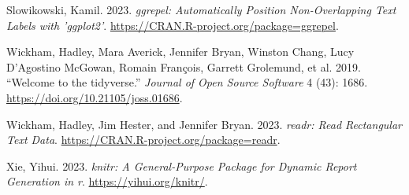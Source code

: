 \documentclass[
  letterpaper,
  DIV=11,
  numbers=noendperiod]{scrartcl}
\newlength{\cslhangindent}
\newlength{\cslentryspacingunit} %
\newenvironment{CSLReferences}[2] %
 {%
  \setlength{\parindent}{0pt}
  \ifodd #1
  \let\oldpar\par
  \def\par{\hangindent=\cslhangindent\oldpar}
  \fi
  \setlength{\parskip}{#2\cslentryspacingunit}
 }%
 {}
\begin{document}
\begin{CSLReferences}{1}{0}
\leavevmode{}%
Slowikowski, Kamil. 2023. \emph{{ggrepel}: Automatically Position
Non-Overlapping Text Labels with '{ggplot2}'}.
\url{https://CRAN.R-project.org/package=ggrepel}.

\leavevmode{}%
Wickham, Hadley, Mara Averick, Jennifer Bryan, Winston Chang, Lucy
D'Agostino McGowan, Romain François, Garrett Grolemund, et al. 2019.
{``Welcome to the {tidyverse}.''} \emph{Journal of Open Source Software}
4 (43): 1686. \url{https://doi.org/10.21105/joss.01686}.

\leavevmode{}%
Wickham, Hadley, Jim Hester, and Jennifer Bryan. 2023. \emph{{readr}:
Read Rectangular Text Data}.
\url{https://CRAN.R-project.org/package=readr}.

\leavevmode{}%
Xie, Yihui. 2023. \emph{{knitr}: A General-Purpose Package for Dynamic
Report Generation in r}. \url{https://yihui.org/knitr/}.

\end{CSLReferences}
\end{document}
